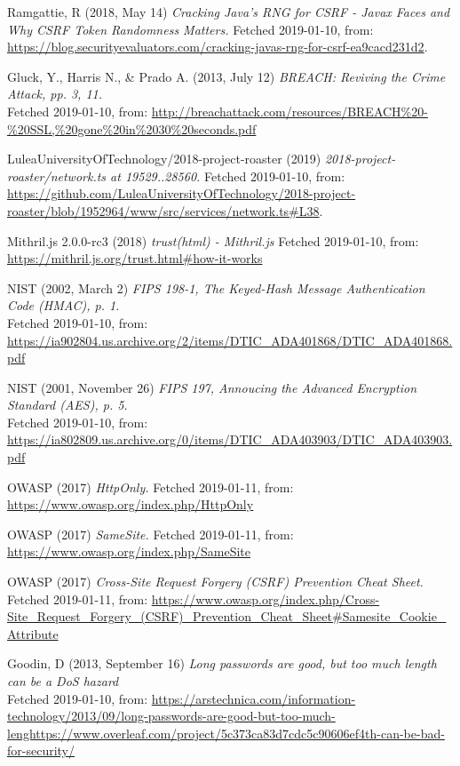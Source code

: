 \documentclass[12pt,a4paper]{report}
\begin{document}
\newpage
\apptocmd{\sloppy}{\hbadness 10000\relax}{}{} 
{\RaggedRight\begin{thebibliography}{1}

Ramgattie, R (2018, May 14) {\em  Cracking Java’s RNG for CSRF - Javax Faces and Why CSRF Token Randomness Matters.}
Fetched 2019-01-10, from:
\url{https://blog.securityevaluators.com/cracking-javas-rng-for-csrf-ea9cacd231d2}.

Gluck, Y., Harris N., \& Prado A. (2013, July 12) {\em BREACH: Reviving the Crime Attack, pp. 3, 11.} \\
Fetched 2019-01-10, from:
\url{http://breachattack.com/resources/BREACH%20-%20SSL,%20gone%20in%2030%20seconds.pdf}

LuleaUniversityOfTechnology/2018-project-roaster (2019) {\em 2018-project-roaster/network.ts at 19529..28560.}
Fetched 2019-01-10, from:
\url{https://github.com/LuleaUniversityOfTechnology/2018-project-roaster/blob/1952964/www/src/services/network.ts#L38}.

Mithril.js 2.0.0-rc3 (2018) {\em trust(html) - Mithril.js}
Fetched 2019-01-10, from:
\url{https://mithril.js.org/trust.html#how-it-works}

NIST (2002, March 2) {\em FIPS 198-1, The Keyed-Hash Message Authentication Code (HMAC), p. 1.} \\
Fetched 2019-01-10, from:
\url{https://ia902804.us.archive.org/2/items/DTIC_ADA401868/DTIC_ADA401868.pdf}

NIST (2001, November 26) {\em FIPS 197, Annoucing the Advanced Encryption Standard (AES), p. 5.} \\
Fetched 2019-01-10, from:
\url{https://ia802809.us.archive.org/0/items/DTIC_ADA403903/DTIC_ADA403903.pdf}

OWASP (2017) {\em HttpOnly.} Fetched 2019-01-11, from:
\url{https://www.owasp.org/index.php/HttpOnly}

OWASP (2017) {\em SameSite.} Fetched 2019-01-11, from:
\url{https://www.owasp.org/index.php/SameSite}

OWASP (2017) {\em Cross-Site Request Forgery (CSRF) Prevention Cheat Sheet.} Fetched 2019-01-11, from:
\url{https://www.owasp.org/index.php/Cross-Site_Request_Forgery_(CSRF)_Prevention_Cheat_Sheet#Samesite_Cookie_Attribute}

Goodin, D (2013, September 16) {\em Long passwords are good, but too much length can be a DoS hazard} \\
Fetched 2019-01-10, from:
\url{https://arstechnica.com/information-technology/2013/09/long-passwords-are-good-but-too-much-lenghttps://www.overleaf.com/project/5c373ca83d7cdc5c90606ef4th-can-be-bad-for-security/}


\end{thebibliography}}
\end{document}
